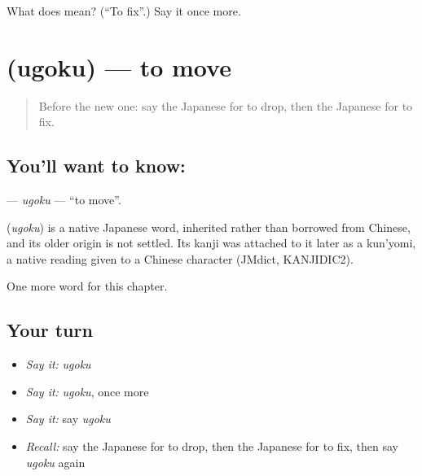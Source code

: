\begin{tcolorbox}[breakable,colback=teal!4,colframe=teal!35!black,title={Before you move on}]
What does  mean? (\textquotedblleft{}To fix\textquotedblright{}.) Say it once more.
\end{tcolorbox}
\section[\texorpdfstring{\ja{うごく} (ugoku)}{うごく (ugoku)}]{ (ugoku) — to move}

\label{lesson:JA-C31-ugoku}



\begin{quote}
Before the new one: say the Japanese for to drop, then the Japanese for to fix.
\end{quote}

\subsection*{You'll want to know: }
\textbf{} — \emph{ugoku} — \textquotedblleft{}to move\textquotedblright{}.

\begin{cousinweb}
\textbf{} (\emph{ugoku}) is a native Japanese word, inherited rather than borrowed from Chinese, and its older origin is not settled. Its kanji was attached to it later as a kun'yomi, a native reading given to a Chinese character (JMdict, KANJIDIC2).
\end{cousinweb}

\begin{grammarlens}[title={What you've built}]
One more word for this chapter.
\end{grammarlens}

\subsection*{Your turn}
\begin{itemize}
\raggedright
  \item \emph{Say it:} \emph{ugoku}
  \item \emph{Say it:} \emph{ugoku}, once more
  \item \emph{Say it:} say \emph{ugoku}
  \item \emph{Recall:} say the Japanese for to drop, then the Japanese for to fix, then say \emph{ugoku} again
\end{itemize}

